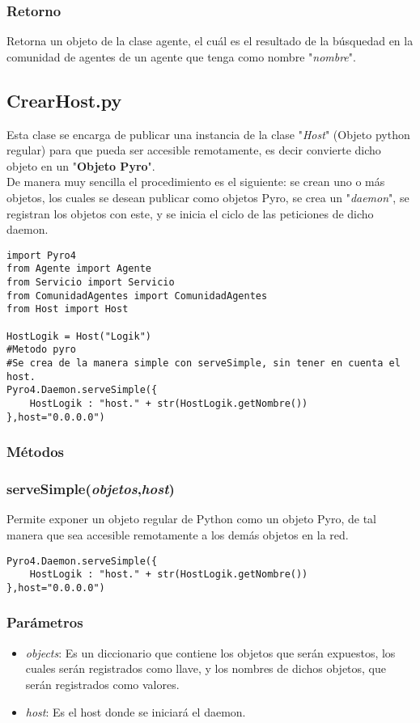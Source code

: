\documentclass{article}
\begin{document}
\subsubsection*{Retorno}
Retorna un objeto de la clase agente, el cuál es el resultado de la búsquedad en la comunidad de agentes de un agente que tenga como nombre "\textit{nombre}".
\subsection{CrearHost.py}
Esta clase se encarga de publicar una instancia de la clase "\textit{Host}" (Objeto python regular) para que pueda ser accesible remotamente, es decir convierte dicho objeto en un "\textbf{Objeto Pyro}".\\

De manera muy sencilla el procedimiento es el siguiente: se crean uno o más objetos, los cuales se desean publicar como objetos Pyro, se crea un "\textit{daemon}", se registran los objetos con este, y se inicia el ciclo de las peticiones de dicho daemon.
\begin{lstlisting}
import Pyro4
from Agente import Agente
from Servicio import Servicio
from ComunidadAgentes import ComunidadAgentes
from Host import Host

HostLogik = Host("Logik")
#Metodo pyro
#Se crea de la manera simple con serveSimple, sin tener en cuenta el host.
Pyro4.Daemon.serveSimple({
    HostLogik : "host." + str(HostLogik.getNombre())
},host="0.0.0.0")
\end{lstlisting}
\subsubsection*{Métodos}
\subsubsection{\textbf{serveSimple}(\textit{objetos},\textit{host})}
Permite exponer un objeto regular de Python como un objeto Pyro, de tal manera que sea accesible remotamente a los demás objetos en la red.
\begin{lstlisting}
Pyro4.Daemon.serveSimple({
    HostLogik : "host." + str(HostLogik.getNombre())
},host="0.0.0.0")
\end{lstlisting}
\subsubsection*{Parámetros}
\begin{itemize}
\item \textit{objects}: Es un diccionario que contiene los objetos que serán expuestos, los cuales serán registrados como llave, y los nombres de dichos objetos, que serán registrados como valores.
\item \textit{host}: Es el host donde se iniciará el daemon.
\end{itemize}
\end{document}
